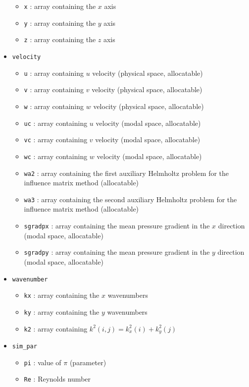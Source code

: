 \begin{itemize}
\begin{itemize}
\item \texttt{x} : array containing the $x$ axis
\item \texttt{y} : array containing the $y$ axis
\item \texttt{z} : array containing the $z$ axis
\end{itemize}
\item \texttt{velocity}
\begin{itemize}
\item \texttt{u} : array containing $u$ velocity (physical space, allocatable)
\item \texttt{v} : array containing $v$ velocity (physical space, allocatable)
\item \texttt{w} : array containing $w$ velocity (physical space, allocatable)
\item \texttt{uc} : array containing $u$ velocity (modal space, allocatable)
\item \texttt{vc} : array containing $v$ velocity (modal space, allocatable)
\item \texttt{wc} : array containing $w$ velocity (modal space, allocatable)
\item \texttt{wa2} : array containing the first auxiliary Helmholtz problem for the influence matrix method (allocatable)
\item \texttt{wa3} : array containing the second auxiliary Helmholtz problem for the influence matrix method (allocatable)
\item \texttt{sgradpx} : array containing the mean pressure gradient in the $x$ direction (modal space, allocatable)
\item \texttt{sgradpy} : array containing the mean pressure gradient in the $y$ direction (modal space, allocatable)
\end{itemize}
\item \texttt{wavenumber}
\begin{itemize}
\item \texttt{kx} : array containing the $x$ wavenumbers
\item \texttt{ky} : array containing the $y$ wavenumbers
\item \texttt{k2} : array containing $k^2(i,j)=k_x^2(i)+k_y^2(j)$
\end{itemize}
\item \texttt{sim\_par}
\begin{itemize}
\item \texttt{pi} : value of $\pi$ (parameter)
\item \texttt{Re} : Reynolds number

\end{itemize}
\end{itemize}
